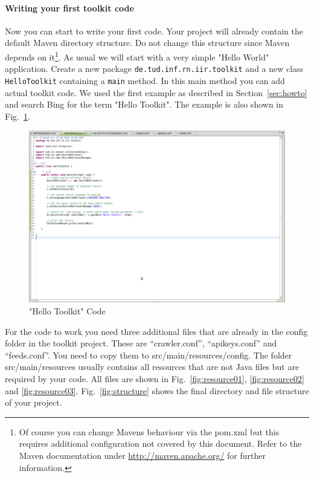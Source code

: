 \documentclass[a4paper,twoside]{book}      %
\begin{document}
\paragraph{Writing your first toolkit code} Now you can start to write your first code. Your project will already contain the default Maven directory structure. Do not change this structure since Maven depends on it\footnote{Of course you can change Mavens behaviour via the pom.xml but this requires additional configuration not covered by this document. Refer to the Maven documentation under \url{http://maven.apache.org/} for further information.}. As usual we will start with a very simple "Hello World" application. Create a new package \texttt{de.tud.inf.rn.iir.toolkit} and a new class \texttt{HelloToolkit} containing a \texttt{main} method. In this main method you can add actual toolkit code. We used the first example as described in Section~\ref{sec:howto} and search Bing for the term "Hello Toolkit". The example is also shown in Fig.~\ref{fig:hellotoolkit}.
\begin{figure}
\includegraphics[width=\textwidth]{img/ht10.png}
\caption{"Hello Toolkit" Code}
\label{fig:hellotoolkit}
\end{figure}
For the code to work you need three additional files that are already in the config folder in the toolkit project. These are ``crawler.conf'', ``apikeys.conf'' and ``feeds.conf''. You need to copy them to src/main/resources/config. The folder src/main/resources usually contains all resources that are not Java files but are required by your code. All files are shown in Fig.~\ref{fig:resource01}, \ref{fig:resource02} and \ref{fig:resource03}. Fig.~\ref{fig:structure} shows the final directory and file structure of your project.
\end{document}
